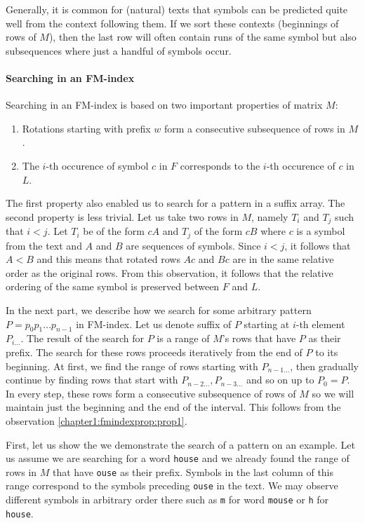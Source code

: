 Generally, it is common for (natural) texts that symbols can be predicted quite well from the context
following them. If we sort these contexts (beginnings of rows of $M$), then the last row will often
contain runs of the same symbol but also subsequences where just a handful of symbols occur.

\paragraph{Searching in an FM-index}

Searching in an FM-index is based on two important properties of matrix $M$:

\begin{enumerate}
	\item Rotations starting with prefix $w$ form a consecutive subsequence of rows in $M$.
	\label{chapter1:fmindexprop:prop1}
	\item The $i$-th occurence of symbol $c$ in $F$ corresponds to the $i$-th occurence of $c$ in~$L$.
	\label{chapter1:fmindexprop:prop2}
\end{enumerate}

The first property also enabled us to search for a pattern in a suffix array. The second
property is less trivial. Let us take two rows in $M$, namely $T_i$ and $T_j$ such that
$i<j$. Let $T_i$ be of the form $cA$ and $T_j$ of the form $cB$ where $c$ is a symbol from
the text and $A$ and $B$ are sequences of symbols. Since $i<j$, it follows that $A<B$ and
this means that rotated rows $Ac$ and $Bc$ are in the same relative order as the original rows.
From this observation, it follows that the relative ordering of the same symbol is preserved
between $F$ and $L$.

In the next part, we describe how we search for some arbitrary pattern $P=p_0p_1\ldots p_{n-1}$
in FM-index. Let us denote suffix of $P$ starting at $i$-th element $P_{i\ldots}$. The result of
the search for $P$ is a range of $M$’s rows that have $P$ as their prefix. The search for these
rows proceeds iteratively from the end of $P$ to its beginning. At first, we find the range of
rows starting with  $P_{n-1\ldots}$, then gradually continue by finding rows that start with
$P_{n-2\ldots}, P_{n-3\ldots}$ and so on up to $P_0=P$. In every step, these rows form a
consecutive subsequence of rows of $M$ so we  will maintain just the beginning and the end of
the interval. This follows from the observation \ref{chapter1:fmindexprop:prop1}.

First, let us show the  we demonstrate the search of a pattern on an example. Let us assume we are searching for a word
{\tt house} and we already found the range of rows in $M$ that have {\tt ouse}
as their prefix. Symbols in the last column of this range correspond to the symbols
preceding {\tt ouse} in the text. We may observe different symbols in arbitrary order there such as {\tt m}
for word {\tt mouse} or {\tt h} for {\tt house}.

